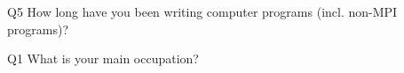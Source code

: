 \begin{description}%
\item{Q5} How long have you been writing computer programs (incl. non-MPI programs)?%
\item{Q1} What is your main occupation?%
\end{description}%
